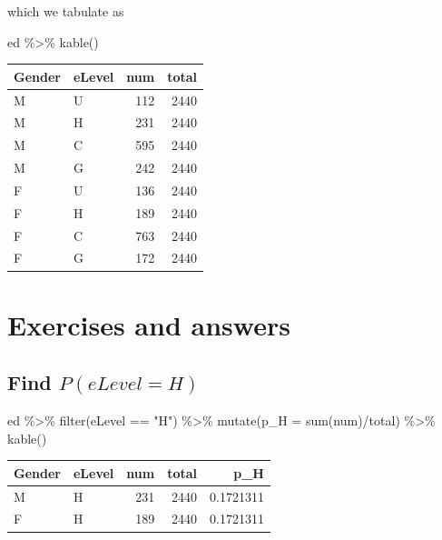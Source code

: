 \documentclass[
  letterpaper,
]{book}
\newenvironment{Shaded}{\begin{snugshade}}{\end{snugshade}}
\newcommand{\AttributeTok}[1]{\textcolor[rgb]{0.40,0.45,0.13}{#1}}
\newcommand{\FunctionTok}[1]{\textcolor[rgb]{0.28,0.35,0.67}{#1}}
\newcommand{\NormalTok}[1]{\textcolor[rgb]{0.00,0.23,0.31}{#1}}
\newcommand{\SpecialCharTok}[1]{\textcolor[rgb]{0.37,0.37,0.37}{#1}}
\newcommand{\StringTok}[1]{\textcolor[rgb]{0.13,0.47,0.30}{#1}}
\begin{document}
which we tabulate as

\begin{Shaded}
\begin{Highlighting}[]
\NormalTok{ed }\SpecialCharTok{\%\textgreater{}\%}
  \FunctionTok{kable}\NormalTok{()}
\end{Highlighting}
\end{Shaded}

\begin{longtable}[]{@{}llrr@{}}
\toprule\noalign{}
Gender & eLevel & num & total \\
\midrule\noalign{}
\endhead
\bottomrule\noalign{}
\endlastfoot
M & U & 112 & 2440 \\
M & H & 231 & 2440 \\
M & C & 595 & 2440 \\
M & G & 242 & 2440 \\
F & U & 136 & 2440 \\
F & H & 189 & 2440 \\
F & C & 763 & 2440 \\
F & G & 172 & 2440 \\
\end{longtable}

\hypertarget{exercises-and-answers}{%
\section{Exercises and answers}\label{exercises-and-answers}}

\hypertarget{find-pelevel-h}{%
\subsection{\texorpdfstring{Find
\(P(eLevel = H)\)}{Find P(eLevel = H)}}\label{find-pelevel-h}}

\begin{Shaded}
\begin{Highlighting}[]
\NormalTok{ed }\SpecialCharTok{\%\textgreater{}\%}
  \FunctionTok{filter}\NormalTok{(eLevel }\SpecialCharTok{==} \StringTok{"H"}\NormalTok{) }\SpecialCharTok{\%\textgreater{}\%}
  \FunctionTok{mutate}\NormalTok{(}\AttributeTok{p\_H =} \FunctionTok{sum}\NormalTok{(num)}\SpecialCharTok{/}\NormalTok{total) }\SpecialCharTok{\%\textgreater{}\%}
  \FunctionTok{kable}\NormalTok{()}
\end{Highlighting}
\end{Shaded}

\begin{longtable}[]{@{}llrrr@{}}
\toprule\noalign{}
Gender & eLevel & num & total & p\_H \\
\midrule\noalign{}
\endhead
\bottomrule\noalign{}
\endlastfoot
M & H & 231 & 2440 & 0.1721311 \\
F & H & 189 & 2440 & 0.1721311 \\
\end{longtable}
\end{document}
